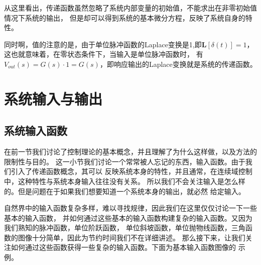 \documentclass{ctexart}
\begin{document}
从这里看出，传递函数虽然忽略了系统内部变量的初始值，不能求出在非零初始值情况下系统的输出，
但是却可以得到系统的基本微分方程，反映了系统自身的特性。

同时啊，值的注意的是，由于单位脉冲函数的Laplace变换是1,即$\mathbf{L}[\delta(t)]=1$，
这也就意味着，在零状态条件下，当输入是单位脉冲函数时，
有$V_{out}(s) = G(s) \cdot 1 = G(s)$，即响应输出的Laplace变换就是系统的传递函数。

\section*{系统输入与输出}

\subsection*{系统输入函数}

在前一节我们讨论了控制理论的基本概念，并且理解了为什么这样做，以及方法的限制性与目的。
这一小节我们讨论一个常常被人忘记的东西，输入函数。由于我们引入了传递函数概念，其可以
反映系统本身的特性，并且通常，在连续域控制中，这种特性与系统本身输入往往没有关系。
所以我们不会关注输入是怎么样的。但是问题在于如果我们想要知道一个系统本身的输出，就必然
给定输入。

自然界中的输入函数复杂多样，难以寻找规律，因此我们在这里仅仅讨论一下一些基本的输入函数，
并如何通过这些基本的输入函数构建复杂的输入函数。又因为我们熟知的脉冲函数，单位阶跃函数，
单位斜坡函数，单位抛物线函数，三角函数的图像十分简单，因此为节约时间我们不在详细讲述。
那么接下来，让我们关注如何通过这些函数获得一些复杂的输入函数。下面为基本输入函数图像的
示例。
\end{document}
